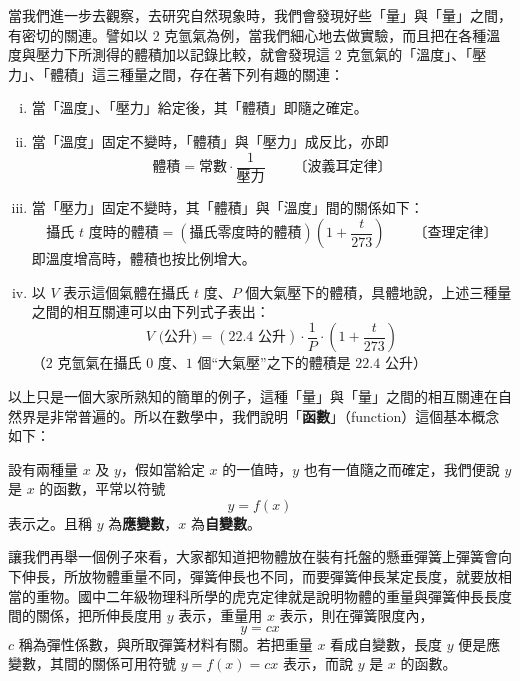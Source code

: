 當我們進一步去觀察，去研究自然現象時，我們會發現好些「量」與「量」之間，有密切的關連。譬如以 $2$ 克氫氣為例，當我們細心地去做實驗，而且把在各種溫度與壓力下所測得的體積加以記錄比較，就會發現這 $2$ 克氫氣的「溫度」、「壓力」、「體積」這三種量之間，存在著下列有趣的關連：

\begin{enumerate}[(i)]
  \item 當「溫度」、「壓力」給定後，其「體積」即隨之確定。
  \item 當「溫度」固定不變時，「體積」與「壓力」成反比，亦即
  \begin{equation}\label{eq:boyle}
    \text{體積} = \text{常數} \cdot \frac{1}{\text{壓力}} \qquad \text{〔波義耳定律〕}
  \end{equation}
  \item 當「壓力」固定不變時，其「體積」與「溫度」間的關係如下：
  \begin{equation}\label{eq:charles}
    \text{攝氏 } t \text{ 度時的體積} = (\text{攝氏零度時的體積}) \left(1 + \frac{t}{273}\right) \qquad \text{〔查理定律〕}
  \end{equation}
  即溫度增高時，體積也按比例增大。
  \item 以 $V$ 表示這個氣體在攝氏 $t$ 度、$P$ 個大氣壓下的體積，具體地說，上述三種量之間的相互關連可以由下列式子表出：
  \begin{equation}\label{eq:ideal_gas}
    V \text{ (公升)} = (22.4 \text{ 公升}) \cdot \frac{1}{P} \cdot \left(1 + \frac{t}{273}\right)
  \end{equation}
  （$2$ 克氫氣在攝氏 $0$ 度、$1$ 個“大氣壓”之下的體積是 $22.4$ 公升）
\end{enumerate}

以上只是一個大家所熟知的簡單的例子，這種「量」與「量」之間的相互關連在自然界是非常普遍的。所以在數學中，我們說明「\textbf{函數}」（function）這個基本概念如下：

\begin{definition}[函數的定義]\label{def:function}
設有兩種量 $x$ 及 $y$，假如當給定 $x$ 的一值時，$y$ 也有一值隨之而確定，我們便說 $y$ 是 $x$ 的函數，平常以符號 
\begin{equation}\label{eq:function_def}
  y = f(x)
\end{equation}
表示之。且稱 $y$ 為\textbf{應變數}，$x$ 為\textbf{自變數}。
\end{definition}

讓我們再舉一個例子來看，大家都知道把物體放在裝有托盤的懸垂彈簧上彈簧會向下伸長，所放物體重量不同，彈簧伸長也不同，而要彈簧伸長某定長度，就要放相當的重物。國中二年級物理科所學的虎克定律就是說明物體的重量與彈簧伸長長度間的關係，把所伸長度用 $y$ 表示，重量用 $x$ 表示，則在彈簧限度內，
\begin{equation}\label{eq:hooke_y}
  y = cx
\end{equation}
$c$ 稱為彈性係數，與所取彈簧材料有關。若把重量 $x$ 看成自變數，長度 $y$ 便是應變數，其間的關係可用符號 $y = f(x) = cx$ 表示，而說 $y$ 是 $x$ 的函數。

